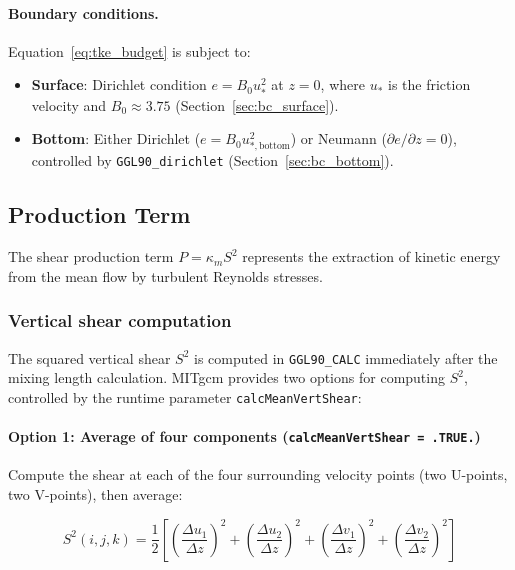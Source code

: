 \documentclass[12pt,letterpaper]{article}
\begin{document}
\paragraph{Boundary conditions.} Equation~\eqref{eq:tke_budget} is subject to:
\begin{itemize}
\item \textbf{Surface}: Dirichlet condition $e = B_0 u_*^2$ at $z=0$, where $u_*$ is the friction velocity and $B_0 \approx 3.75$ (Section~\ref{sec:bc_surface}).
\item \textbf{Bottom}: Either Dirichlet ($e = B_0 u_{*,\text{bottom}}^2$) or Neumann ($\partial e/\partial z = 0$), controlled by \verb|GGL90_dirichlet| (Section~\ref{sec:bc_bottom}).
\end{itemize}

\subsection{Production Term}
\label{sec:tke_production}

The shear production term $P = \kappa_m S^2$ represents the extraction of kinetic energy from the mean flow by turbulent Reynolds stresses.

\subsubsection{Vertical shear computation}

The squared vertical shear $S^2$ is computed in \verb|GGL90_CALC| immediately after the mixing length calculation. MITgcm provides two options for computing $S^2$, controlled by the runtime parameter \verb|calcMeanVertShear|:

\paragraph{Option 1: Average of four components (\texttt{calcMeanVertShear = .TRUE.})}

Compute the shear at each of the four surrounding velocity points (two U-points, two V-points), then average:

\begin{equation}
S^2(i,j,k) = \frac{1}{2} \left[
\left(\frac{\Delta u_1}{\Delta z}\right)^2 + \left(\frac{\Delta u_2}{\Delta z}\right)^2
+ \left(\frac{\Delta v_1}{\Delta z}\right)^2 + \left(\frac{\Delta v_2}{\Delta z}\right)^2
\right]
\label{eq:shear_option1}
\end{equation}
\end{document}
